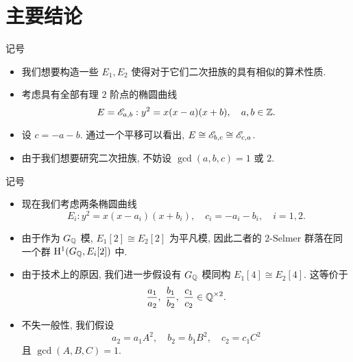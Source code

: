 \documentclass[aspectratio=169,handout]{ctexbeamer}
\begin{document}
\section{主要结论}
\begin{frame}{记号}
\begin{itemize}
\item 我们想要构造一些 $E_1,E_2$ 使得对于它们二次扭族的具有相似的算术性质.
\item 考虑具有全部有理 $2$ 阶点的椭圆曲线
\[E=\mathscr{E}_{a,b}:y^2=x(x-a)(x+b),\quad a,b\in{\mathbb{Z}}.\]
\item 设 $c=-a-b$. 通过一个平移可以看出, $E\cong\mathscr{E}_{b,c}\cong\mathscr{E}_{c,a}$.
\item 由于我们想要研究二次扭族, 不妨设 $\gcd(a,b,c)=1$ 或 $2$.
\end{itemize}
\end{frame}

\begin{frame}[<+->]{记号}
\begin{itemize}
\item 现在我们考虑两条椭圆曲线
\[E_i:y^2=x(x-a_i)(x+b_i),\quad c_i=-a_i-b_i,\quad i=1,2.\]
\item 由于作为 $G_{\mathbb{Q}}$ 模, $E_1[2]\cong E_2[2]$ 为平凡模, 因此二者的 $2$-Selmer 群落在同一个群 ${\mathrm{H}}^1(G_{\mathbb{Q}},E_i[2])$ 中. 
\item 由于技术上的原因, 我们进一步假设有 $G_{\mathbb{Q}}$ 模同构 $E_1[4]\cong E_2[4]$.
\onslide<+->
这等价于
\[\frac{a_1}{a_2},\ \frac{b_1}{b_2},\ \frac{c_1}{c_2}\in\BQ^{\times2}.\]
\item 不失一般性, 我们假设
\[a_2=a_1 A^2,\quad b_2=b_1 B^2,\quad c_2=c_1 C^2 \]
且 $\gcd(A,B,C)=1$.
\end{itemize}
\end{frame}
\end{document}
